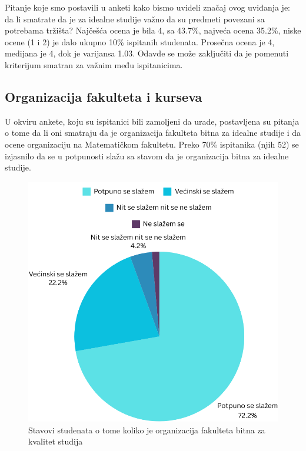 \documentclass[a4paper]{article}
\begin{document}
{Pitanje koje smo postavili u anketi kako bismo uvideli značaj ovog uviđanja je: da li smatrate da je za idealne studije važno da su predmeti povezani sa potrebama tržišta? Najčešća ocena je bila 4, sa 43.7\%, najveća ocena 35.2\%, niske ocene (1 i 2) je dalo ukupno 10\% ispitanih studenata. Prosečna ocena je 4, medijana je 4, dok je varijansa 1.03. Odavde se može zaključiti da je pomenuti kriterijum smatran za važnim među ispitanicima.


\subsection{Organizacija fakulteta i kurseva}
\label{subsec:organizacija_stavovi}

U okviru ankete, koju su ispitanici bili zamoljeni da urade, postavljena su pitanja o tome da li oni smatraju da je organizacija fakulteta bitna za idealne studije i da ocene organizaciju na Matematičkom fakultetu. Preko 70\% ispitanika (njih 52) se izjasnilo da se u potpunosti slažu sa stavom da je organizacija bitna za idealne studije.
\begin{figure}[h!]
\begin{center}
    \includegraphics[scale = 0.3]{PieChartOrganizacija.png}
    \caption{Stavovi studenata o tome koliko je organizacija fakulteta bitna za kvalitet studija}
    \label{fig:organizacija}
\end{center}
\end{figure}

}
\end{document}
